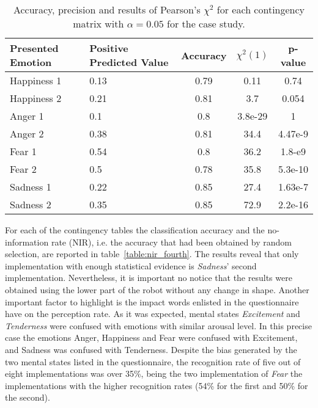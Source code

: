 \clearpage
\begin{table}[h]
\centering
\small
\caption{Accuracy, precision and results of Pearson's $\chi^2$ for each contingency matrix with $\alpha = 0.05$ for the case study.} 
\label{table:Precision2}
		\begin{tabular}{|p{1.5 cm}|p{1.5 cm}|c|c|c|}
		\hline
		\textbf{Presented Emotion} & \textbf{Positive Predicted Value} & \textbf{Accuracy} & \textbf{$\chi^2(1)$} & \textbf{p-value}\\
		\hline
		Happiness 1 & 0.13 & 0.79 & 0.11 & 0.74\\
		\hline
		Happiness 2 & 0.21 & 0.81& 3.7 &0.054\\
		\hline
		Anger 1 & 0.1 & 0.8 & 3.8e-29 & 1\\
		\hline
		Anger 2 & 0.38 & 0.81 & 34.4 & 4.47e-9\\
		\hline
		Fear 1 & 0.54 & 0.8 & 36.2 & 1.8-e9\\
		\hline 
		Fear 2 & 0.5 & 0.78 & 35.8 & 5.3e-10\\
		\hline
		Sadness 1 & 0.22 & 0.85 & 27.4 & 1.63e-7\\
		\hline
		Sadness 2 & 0.35 & 0.85 & 72.9 & 2.2e-16\\		 
		\hline
			\end{tabular}
\end{table}  

 For each of the contingency tables the classification accuracy and the no-information rate (NIR), i.e. the accuracy that had been obtained by random selection, are reported in table~\ref{table:nir_fourth}. The results reveal that only implementation with enough statistical evidence is \textit{Sadness}' second implementation. 
Nevertheless, it is important no notice that the results were obtained using the lower part of the robot without any change in shape. Another important factor to highlight is the impact words enlisted in the questionnaire have on the perception rate. As it was expected, mental states \textit{Excitement} and \textit{Tenderness} were confused with emotions with similar arousal level. In this precise case the emotions Anger, Happiness and Fear were confused with Excitement, and Sadness was confused with Tenderness. Despite the bias generated by the two mental states listed in the questionnaire, the recognition rate of five out of eight implementations was over 35\%, being the two implementation of \textit{Fear} the implementations with the higher recognition rates (54\% for the first and 50\% for the second).

